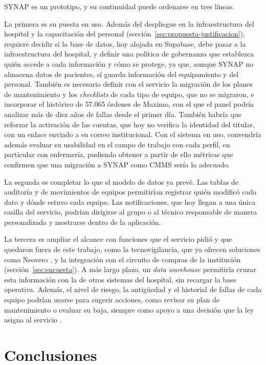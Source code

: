 \documentclass[10pt]{article}
\begin{document}
SYNAP es un prototipo, y su continuidad puede ordenarse en tres líneas.

La primera es su puesta en uso. Además del despliegue en la infraestructura del hospital y la capacitación del personal (sección~\ref{sec:propuesta-justificacion}), requiere decidir si la base de datos, hoy alojada en Supabase, debe pasar a la infraestructura del hospital, y definir una política de gobernanza que establezca quién accede a cada información y cómo se protege, ya que, aunque SYNAP no almacena datos de pacientes, sí guarda información del equipamiento y del personal. También es necesario definir con el servicio la migración de los planes de mantenimiento y los \textit{checklists} de cada tipo de equipo, que no se migraron, e incorporar el histórico de 57.065 órdenes de Maximo, con el que el panel podría analizar más de diez años de fallas desde el primer día. También habría que reforzar la activación de las cuentas, que hoy no verifica la identidad del titular, con un enlace enviado a su correo institucional. Con el sistema en uso, convendría además evaluar su usabilidad en el campo de trabajo con cada perfil, en particular con enfermería, pudiendo obtener a partir de ello métricas que confirmen que una migración a SYNAP como CMMS sería lo adecuado.

La segunda es completar lo que el modelo de datos ya prevé. Las tablas de auditoría y de movimientos de equipos permitirían registrar quién modificó cada dato y dónde estuvo cada equipo. Las notificaciones, que hoy llegan a una única casilla del servicio, podrían dirigirse al grupo o al técnico responsable de manera personalizada y mostrarse dentro de la aplicación. 

La tercera es ampliar el alcance con funciones que el servicio pidió y que quedaron fuera de este trabajo, como la tecnovigilancia, que ya ofrecen soluciones como Neovero \cite{neovero}, y la integración con el circuito de compras de la institución (sección~\ref{sec:encuesta}). A más largo plazo, un \emph{data warehouse} permitiría cruzar esta información con la de otros sistemas del hospital, sin recargar la base operativa. Además, el nivel de riesgo, la antigüedad y el historial de fallas de cada equipo podrían usarse para sugerir acciones, como revisar su plan de mantenimiento o evaluar su baja, siempre como apoyo a una decisión que la ley asigna al servicio \cite{ley_26906}.

\newpage
\section{Conclusiones}
\label{sec:conclusiones}
\end{document}

